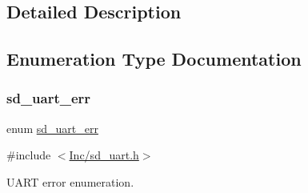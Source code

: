 \subsection{Detailed Description}


\subsection{Enumeration Type Documentation}
\mbox{\label{group___s_d___u_a_r_t___types_gaff649a266fb34035c10733370c4fd104}} 
\subsubsection{\texorpdfstring{sd\+\_\+uart\+\_\+err}{sd\_uart\_err}}
{\footnotesize\ttfamily enum \mbox{\hyperlink{group___s_d___u_a_r_t___types_gaff649a266fb34035c10733370c4fd104}{sd\+\_\+uart\+\_\+err}}}



{\ttfamily \#include $<$\mbox{\hyperlink{sd__uart_8h}{Inc/sd\+\_\+uart.\+h}}$>$}



U\+A\+RT error enumeration. 

